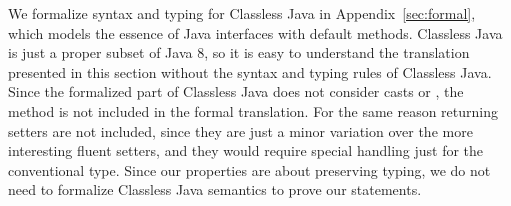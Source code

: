 We formalize syntax and typing for
 Classless Java in Appendix~\ref{sec:formal}, which models the essence of
Java interfaces with default methods.
 Classless Java is just a proper subset of Java 8, so
it is easy to understand the translation presented in this section
without the syntax and typing rules of Classless Java.
Since the formalized part of Classless Java does not consider casts or \Q@instanceof@,
the \Q@with@ method is not included in the
formal translation. For the same reason \Q@void@ returning setters are
not included, since they are just a minor variation over the more
interesting fluent setters, and they would require special handling
just for the conventional \Q@void@ type.
Since our properties are about preserving typing,
we do not need to formalize Classless Java semantics to prove our statements.
